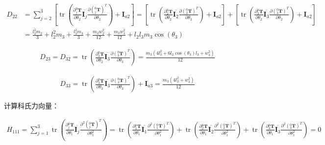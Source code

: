\documentclass{homework}
\begin{document}
\begin{sol}
\begin{align*}
  D_{22} &= \sum_{j=2}^3 [\operatorname{tr} (\frac{\partial {^0_j}\mathbf{T}}{\partial \theta_2} \overline{\mathbf{I}_j} \frac{\partial ({^0_j}\mathbf{T})^T}{\partial \theta_2}) + \mathbf{I}_{a2}]
         = [\operatorname{tr} (\frac{\partial {^0_2}\mathbf{T}}{\partial \theta_2} \overline{\mathbf{I}_2} \frac{\partial ({^0_2}\mathbf{T})^T}{\partial \theta_2}) + \mathbf{I}_{a2}] + [\operatorname{tr} (\frac{\partial {^0_3}\mathbf{T}}{\partial \theta_2} \overline{\mathbf{I}_3} \frac{\partial ({^0_3}\mathbf{T})^T}{\partial \theta_2}) + \mathbf{I}_{a2}] \\
         &= \frac{l_2^2 m_2}{3} + l_2^2 m_3 + \frac{l_3^2 m_3}{3} + \frac{m_2 w_2^2}{12} + \frac{m_3 w_3^2}{12} + l_2 l_3 m_3 \cos(\theta_3)
\end{align*}

\begin{align*}
  D_{23} = D_{32} = \operatorname{tr} (\frac{\partial {^0_3}\mathbf{T}}{\partial \theta_2} \overline{\mathbf{I}_3} \frac{\partial ({^0_3}\mathbf{T})^T}{\partial \theta_3}) 
                  = \frac{m_3 (4 l_3^2 + 6 l_2 \cos(\theta_3) l_3 + w_3^2)}{12}
\end{align*}

\begin{align*}
  D_{33} = \operatorname{tr} (\frac{\partial {^0_3}\mathbf{T}}{\partial \theta_3} \overline{\mathbf{I}_3} \frac{\partial ({^0_3}\mathbf{T})^T}{\partial \theta_3}) + \mathbf{I}_{a3}
         = \frac{m_3 (4 l_3^2 + w_3^2)}{12}
\end{align*}

计算科氏力向量：

\begin{align*}
  H_{111} = \sum_{j=1}^3 \operatorname{tr} (\frac{\partial {^0_j}\mathbf{T}}{\partial \theta_1} \overline{\mathbf{I}_j} \frac{\partial^2 ({^0_j}\mathbf{T})^T}{\partial \theta_1^2}) 
          = \operatorname{tr} (\frac{\partial {^0_1}\mathbf{T}}{\partial \theta_1} \overline{\mathbf{I}_1} \frac{\partial^2 ({^0_1}\mathbf{T})^T}{\partial \theta_1^2}) + \operatorname{tr} (\frac{\partial {^0_2}\mathbf{T}}{\partial \theta_1} \overline{\mathbf{I}_2} \frac{\partial^2 ({^0_2}\mathbf{T})^T}{\partial \theta_1^2}) + \operatorname{tr} (\frac{\partial {^0_3}\mathbf{T}}{\partial \theta_1} \overline{\mathbf{I}_3} \frac{\partial^2 ({^0_3}\mathbf{T})^T}{\partial \theta_1^2})
          = 0
\end{align*}


\end{sol}
\end{document}
